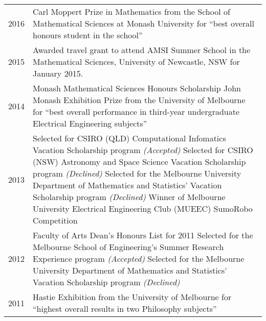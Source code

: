 \documentclass[12pt,a4paper]{article}
\newenvironment{llist}
  {\renewcommand{\arraystretch}{1.5}\begin{longtable}{p{3.5cm} p{12cm}}}
  {\end{longtable}}
\begin{document}
\begin{llist}
  2016 & Carl Moppert Prize in Mathematics from the School of Mathematical Sciences at
         Monash University for ``best overall honours student in the school'' \\
  2015 & Awarded travel grant to attend AMSI Summer School in the Mathematical
         Sciences, University of Newcastle, NSW for January 2015. \\
  2014 & Monash Mathematical Sciences Honours Scholarship \newline \newline
         John Monash Exhibition Prize from the University of Melbourne for ``best overall
         performance in third-year undergraduate Electrical Engineering subjects'' \\
  2013 & Selected for CSIRO (QLD) Computational Infomatics Vacation Scholarship
         program \textit{(Accepted)} \newline \newline
         Selected for CSIRO (NSW) Astronomy and Space Science Vacation
         Scholarship program \textit{(Declined)}\newline \newline
         Selected for the Melbourne University Department of Mathematics and
         Statistics' Vacation Scholarship program \textit{(Declined)} \newline \newline
         Winner of Melbourne University Electrical Engineering Club (MUEEC)
         SumoRobo Competition \\
  2012 & Faculty of Arts Dean's Honours List for 2011 \newline \newline
         Selected for the Melbourne School of Engineering's Summer Research
         Experience program \textit{(Accepted)} \newline \newline
         Selected for the Melbourne University Department of Mathematics and
         Statistics' Vacation Scholarship program \textit{(Declined)} \\
  2011 & Hastie Exhibition from the University of Melbourne for ``highest overall results in two
         Philosophy subjects''
\end{llist}
\end{document}

